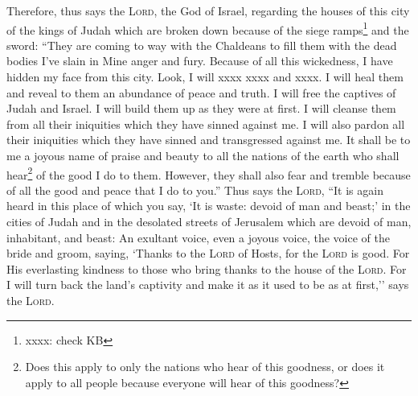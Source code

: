 
\begin{inparaenum}
     Therefore, thus says the \textsc{Lord}, the God of Israel, regarding the houses of this city of the kings of Judah which are broken down because of the siege ramps\footnote{xxxx: check KB} and the sword:%
     ``They are coming to way with the Chaldeans to fill them with the dead bodies I've slain in Mine anger and fury. Because of all this wickedness, I have hidden my face from this city.%
     Look, I will xxxx xxxx and xxxx. I will heal them and reveal to them an abundance of peace and truth.%
     I will free the captives of Judah and Israel. I will build them up as they were at first.%
     I will cleanse them from all their iniquities which they have sinned against me. I will also pardon all their iniquities which they have sinned and transgressed against me.%
     It shall be to me a joyous name of praise and beauty to all the nations of the earth who shall hear\footnote{Does this apply to only the nations who hear of this goodness, or does it apply to all people because everyone will hear of this goodness?} of the good I do to them. However, they shall also fear and tremble because of all the good and peace that I do to you.''%
     Thus says the \textsc{Lord}, ``It is again heard in this place of which you say, `It is waste: devoid of man and beast;' in the cities of Judah and in the desolated streets of Jerusalem which are devoid of man, inhabitant, and beast:%
     An exultant voice, even a joyous voice, the voice of the bride and groom, saying, `Thanks to the \textsc{Lord} of Hosts, for the \textsc{Lord} is good. For His everlasting kindness to those who bring thanks to the house of the \textsc{Lord}. For I will turn back the land's captivity and make it as it used to be as at first,'' says the \textsc{Lord}.%
\end{inparaenum}
